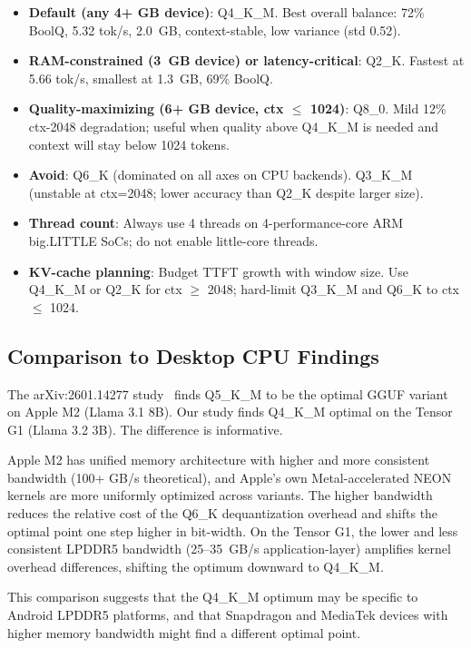 \documentclass[conference]{IEEEtran}
\begin{document}
\begin{itemize}
  \item \textbf{Default (any 4+ GB device)}: Q4\_K\_M. Best overall balance:
        72\% BoolQ, 5.32 tok/s, 2.0~GB, context-stable, low variance (std 0.52).
  \item \textbf{RAM-constrained (3~GB device) or latency-critical}: Q2\_K.
        Fastest at 5.66 tok/s, smallest at 1.3~GB, 69\% BoolQ.
  \item \textbf{Quality-maximizing (6+ GB device, ctx $\leq$ 1024)}: Q8\_0.
        Mild 12\% ctx-2048 degradation; useful when quality above Q4\_K\_M
        is needed and context will stay below 1024 tokens.
  \item \textbf{Avoid}: Q6\_K (dominated on all axes on CPU backends).
        Q3\_K\_M (unstable at ctx=2048; lower accuracy than Q2\_K despite
        larger size).
  \item \textbf{Thread count}: Always use 4 threads on 4-performance-core
        ARM big.LITTLE SoCs; do not enable little-core threads.
  \item \textbf{KV-cache planning}: Budget TTFT growth with window size. Use
        Q4\_K\_M or Q2\_K for ctx $\geq$ 2048; hard-limit Q3\_K\_M and Q6\_K
        to ctx $\leq$ 1024.
\end{itemize}

\subsection{Comparison to Desktop CPU Findings}

The arXiv:2601.14277 study~\cite{whichquant} finds Q5\_K\_M to be the optimal
GGUF variant on Apple M2 (Llama 3.1 8B). Our study finds Q4\_K\_M optimal on
the Tensor G1 (Llama 3.2 3B). The difference is informative.

Apple M2 has unified memory architecture with higher and more consistent
bandwidth (100+ GB/s theoretical), and Apple's own Metal-accelerated NEON
kernels are more uniformly optimized across variants. The higher bandwidth
reduces the relative cost of the Q6\_K dequantization overhead and shifts
the optimal point one step higher in bit-width. On the Tensor G1, the
lower and less consistent LPDDR5 bandwidth (25--35~GB/s application-layer)
amplifies kernel overhead differences, shifting the optimum downward to
Q4\_K\_M.

This comparison suggests that the Q4\_K\_M optimum may be specific to
Android LPDDR5 platforms, and that Snapdragon and MediaTek devices with
higher memory bandwidth might find a different optimal point.
\end{document}
